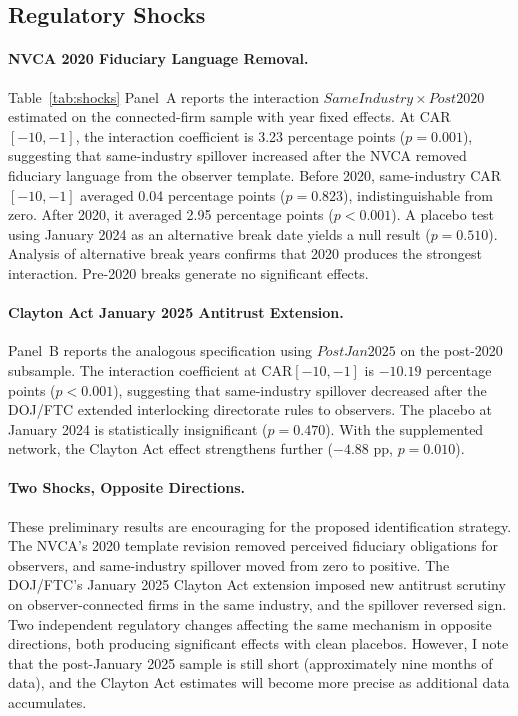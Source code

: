 \subsection{Regulatory Shocks}



\paragraph{NVCA 2020 Fiduciary Language Removal.} Table~\ref{tab:shocks} Panel~A reports the interaction $SameIndustry \times Post2020$ estimated on the connected-firm sample with year fixed effects. At CAR$[-10,-1]$, the interaction coefficient is 3.23 percentage points ($p=0.001$), suggesting that same-industry spillover increased after the NVCA removed fiduciary language from the observer template. Before 2020, same-industry CAR$[-10,-1]$ averaged 0.04 percentage points ($p=0.823$), indistinguishable from zero. After 2020, it averaged 2.95 percentage points ($p<0.001$). A placebo test using January 2024 as an alternative break date yields a null result ($p=0.510$). Analysis of alternative break years confirms that 2020 produces the strongest interaction. Pre-2020 breaks generate no significant effects.

\paragraph{Clayton Act January 2025 Antitrust Extension.} Panel~B reports the analogous specification using $PostJan2025$ on the post-2020 subsample. The interaction coefficient at CAR$[-10,-1]$ is $-10.19$ percentage points ($p<0.001$), suggesting that same-industry spillover decreased after the DOJ/FTC extended interlocking directorate rules to observers. The placebo at January 2024 is statistically insignificant ($p=0.470$). With the supplemented network, the Clayton Act effect strengthens further ($-4.88$ pp, $p=0.010$).

\paragraph{Two Shocks, Opposite Directions.} These preliminary results are encouraging for the proposed identification strategy. The NVCA's 2020 template revision removed perceived fiduciary obligations for observers, and same-industry spillover moved from zero to positive. The DOJ/FTC's January 2025 Clayton Act extension imposed new antitrust scrutiny on observer-connected firms in the same industry, and the spillover reversed sign. Two independent regulatory changes affecting the same mechanism in opposite directions, both producing significant effects with clean placebos. However, I note that the post-January 2025 sample is still short (approximately nine months of data), and the Clayton Act estimates will become more precise as additional data accumulates.

